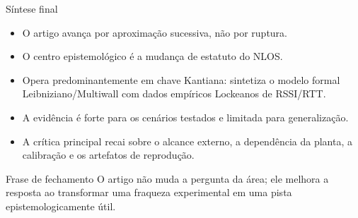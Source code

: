 \documentclass[aspectratio=169,11pt]{beamer}
\begin{document}
\begin{frame}{Síntese final}
  \footnotesize
  \begin{itemize}
    \item O artigo avança por aproximação sucessiva, não por ruptura.
    \item O centro epistemológico é a mudança de estatuto do NLOS.
    \item Opera predominantemente em chave Kantiana: sintetiza o modelo formal Leibniziano/Multiwall com dados empíricos Lockeanos de RSSI/RTT.
    \item A evidência é forte para os cenários testados e limitada para generalização.
    \item A crítica principal recai sobre o alcance externo, a dependência da planta, a calibração e os artefatos de reprodução.
  \end{itemize}

  \vspace{0.28cm}
  \begin{alertblock}{Frase de fechamento}
    O artigo não muda a pergunta da área; ele melhora a resposta ao transformar uma fraqueza experimental em uma pista epistemologicamente útil.
  \end{alertblock}

\end{frame}
\end{document}
